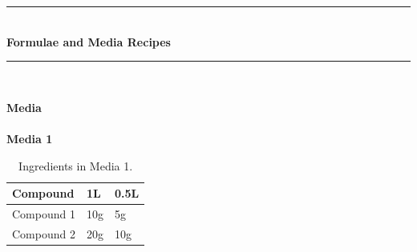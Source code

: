 \documentclass[idxtotoc,hyperref,openany]{labbook} %
\newcommand{\HRule}{\rule{\linewidth}{0.5mm}} %
\begin{document}
\lipsum[6]



\lipsum[7]


\labday{} %

\begin{center}
\HRule \\[0.4cm]
{\huge \textbf{Formulae and Media Recipes}}\\[0.4cm] %
\HRule \\[1.5cm]
\end{center}


\newpage

\huge \textbf{Media} \\ \\

\normalsize \textbf{Media 1}\\
\begin{table}[H]
\begin{tabular}{l l l}
\toprule
\textbf{Compound} & \textbf{1L} & \textbf{0.5L}\\
\toprule
Compound 1 & 10g & 5g\\
Compound 2 & 20g & 10g\\
\bottomrule
\end{tabular}
\caption{Ingredients in Media 1.}
\label{tab:med1}
\end{table}





\newpage
\end{document}
